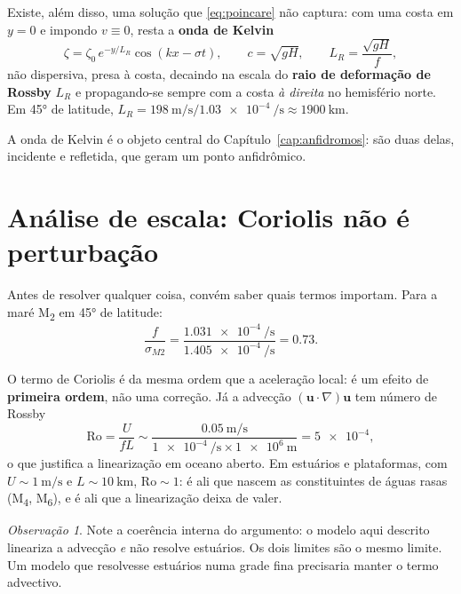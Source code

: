 \documentclass[11pt,a4paper,oneside]{report}
\theoremstyle{definition}
\theoremstyle{plain}
\theoremstyle{remark}
\newtheorem{observacao}[definicao]{Observação}
\newcommand{\vect}[1]{\bm{#1}}
\begin{document}
Existe, além disso, uma solução que \eqref{eq:poincare} não captura: com uma
costa em $y=0$ e impondo $v\equiv 0$, resta a \textbf{onda de Kelvin}
\begin{equation}
\zeta=\zeta_0\,e^{-y/L_R}\cos(kx-\sigma t),
\qquad c=\sqrt{gH},\qquad
L_R=\frac{\sqrt{gH}}{f},
\label{eq:kelvin}
\end{equation}
não dispersiva, presa à costa, decaindo na escala do \textbf{raio de deformação
de Rossby} $L_R$ e propagando-se sempre com a costa \emph{à direita} no
hemisfério norte. Em \ang{45} de latitude,
$L_R=\SI{198}{\meter\per\second}/\SI{1.03e-4}{\per\second}\approx
\SI{1900}{\kilo\meter}$.

A onda de Kelvin é o objeto central do Capítulo~\ref{cap:anfidromos}: são duas
delas, incidente e refletida, que geram um ponto anfidrômico.

\section{Análise de escala: Coriolis não é perturbação}
\label{sec:escala}

Antes de resolver qualquer coisa, convém saber quais termos importam. Para a
maré M\textsubscript{2} em \ang{45} de latitude:
\begin{equation}
\frac{f}{\sigma_{M2}}
=\frac{\SI{1.031e-4}{\per\second}}{\SI{1.405e-4}{\per\second}}
=\num{0.73}.
\end{equation}

O termo de Coriolis é da mesma ordem que a aceleração local: é um efeito de
\textbf{primeira ordem}, não uma correção. Já a advecção
$(\vect{u}\cdot\nabla)\vect{u}$ tem número de Rossby
\begin{equation}
\mathrm{Ro}=\frac{U}{fL}\sim
\frac{\SI{0.05}{\meter\per\second}}
{\SI{1e-4}{\per\second}\times\SI{1e6}{\meter}}
=\num{5e-4},
\end{equation}
o que justifica a linearização em oceano aberto. Em estuários e plataformas,
com $U\sim\SI{1}{\meter\per\second}$ e $L\sim\SI{10}{\kilo\meter}$,
$\mathrm{Ro}\sim 1$: é ali que nascem as constituintes de águas rasas
(M\textsubscript{4}, M\textsubscript{6}), e é ali que a linearização deixa de
valer.

\begin{observacao}
Note a coerência interna do argumento: o modelo aqui descrito lineariza a
advecção \emph{e} não resolve estuários. Os dois limites são o mesmo limite. Um
modelo que resolvesse estuários numa grade fina precisaria manter o termo
advectivo.
\end{observacao}
\end{document}
